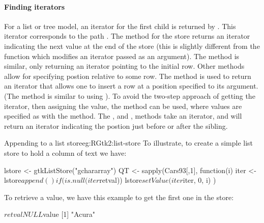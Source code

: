 \paragraph{Finding iterators}
For a list or tree model, an iterator for the first child is returned
by . This iterator corresponds to
the path .
The 
method for the store returns an iterator indicating the next value at
the end of the store (this is slightly different from the \GTK\/ function which
modifies an iterator passed as an argument).  The
 method is similar, only returning an
iterator pointing to the initial row.  Other methods allow for
specifying postion relative to some row. The
 method is used to return an iterator
that allows one to insert a row at a position specified to its
 argument. (The  method is similar to
using ). To avoid the two-step approach of getting the
iterator, then assigning the value, the method
 can be used, where values are
specified as with the  method.  The
, and
, methods take an iterator,
 and will return an iterator indicating the postion just
before or after the sibling.




\begin{example}{Appending to a list store}{eg:RGtk2:list-store}
  To illustrate, to create a simple list store to hold a column
of text we have:  
\begin{Schunk}
\begin{Sinput}
 lstore <- gtkListStore("gchararray")
 QT <- sapply(Cars93[,1], function(i) {
   iter <- lstore$append()
   if(is.null(iter$retval)) 
     lstore$setValue(iter$iter, 0, i)
 })
\end{Sinput}
\end{Schunk}
To retrieve a value, we have this example to get the first one in the store:
\begin{Schunk}
\begin{Soutput}
$retval
NULL

$value
[1] "Acura"
\end{Soutput}
\end{Schunk}
\end{example}

